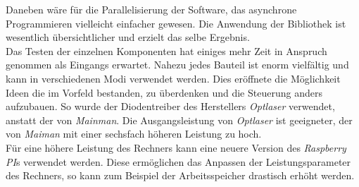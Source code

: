 Daneben wäre für die Parallelisierung der Software, das asynchrone Programmieren vielleicht einfacher gewesen. Die Anwendung der Bibliothek ist wesentlich übersichtlicher und erzielt das selbe Ergebnis.\\


Das Testen der einzelnen Komponenten hat einiges mehr Zeit in Anspruch genommen als Eingangs erwartet. Nahezu jedes Bauteil ist enorm vielfältig und kann in verschiedenen Modi verwendet werden. Dies eröffnete die Möglichkeit Ideen die im Vorfeld bestanden, zu überdenken und die Steuerung anders aufzubauen. So wurde der Diodentreiber des Herstellers \textit{Optlaser} verwendet, anstatt der von \textit{Mainman}. Die Ausgangsleistung von \textit{Optlaser} ist geeigneter, der von \textit{Maiman} mit einer sechsfach höheren Leistung zu hoch.\\

Für eine höhere Leistung des Rechners kann eine neuere Version des \textit{Raspberry PI}s verwendet werden. Diese ermöglichen das Anpassen der Leistungsparameter des Rechners, so kann zum Beispiel der Arbeitsspeicher drastisch erhöht werden.